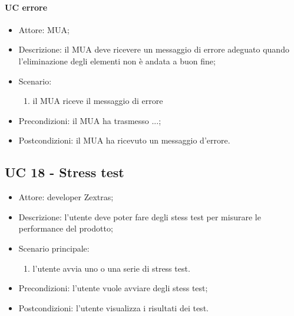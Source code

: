     \paragraph{UC  errore} \label{sec: UC 11.4.2.1}
    \begin{itemize}
        \item Attore: MUA;
        \item Descrizione: il MUA deve ricevere un messaggio di errore adeguato quando l'eliminazione degli elementi non è andata a buon fine;
        \item Scenario:
        \begin{enumerate}
        \item il MUA riceve il messaggio di errore
        \end{enumerate}   
        \item Precondizioni: il MUA ha trasmesso ...;
        \item Postcondizioni: il MUA ha ricevuto un messaggio d'errore.
    \end{itemize}

    \subsection{UC 18 - Stress test}
\begin{itemize}
    \item Attore: developer Zextras;
    \item Descrizione: l'utente deve poter fare degli stess test per misurare le performance del prodotto;
    \item Scenario principale:
        \begin{enumerate}
        \item l'utente avvia uno o una serie di stress test. 
        \end{enumerate}
    \item Precondizioni: l'utente vuole avviare degli stess test;
    \item Postcondizioni: l'utente visualizza i risultati dei test.
\end{itemize}

   

    
